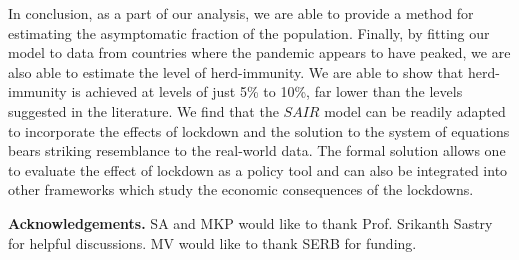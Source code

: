 \documentclass[aps,prl,reprint,superscriptaddress]{revtex4-1}
\begin{document}
In conclusion, as a part of our analysis, we are able to provide a method for estimating the asymptomatic fraction of the population. Finally, by fitting our model to data from countries where the pandemic appears to have peaked, we are also able to estimate the level of herd-immunity. We are able to show that herd-immunity is achieved at levels of just 5\% to 10\%, far lower than the levels suggested in the literature. We find that the $SAIR$ model can be readily adapted to incorporate the effects of lockdown and the solution to the system of equations bears striking resemblance to the real-world data. The formal solution allows one to evaluate the effect of lockdown as a policy tool and can also be integrated into other frameworks which study the economic consequences of the lockdowns.

{\bf Acknowledgements.} SA and MKP would like to thank Prof. Srikanth Sastry for helpful discussions. MV would like to thank SERB for funding.


\end{document}
